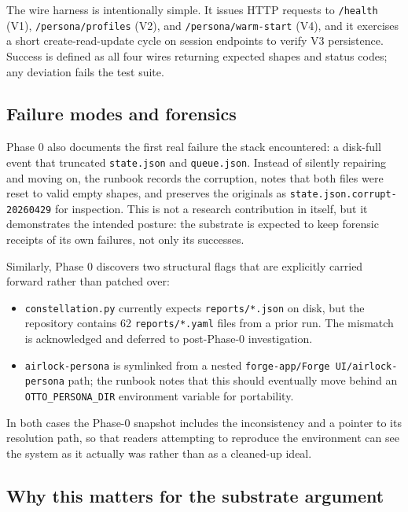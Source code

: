 \documentclass{article}
\providecommand{\tightlist}{\setlength{\itemsep}{0pt}\setlength{\parskip}{0pt}}
\begin{document}
The wire harness is intentionally simple. It issues HTTP requests to
\texttt{/health} (V1), \texttt{/persona/profiles} (V2), and
\texttt{/persona/warm-start} (V4), and it exercises a short
create-read-update cycle on session endpoints to verify V3 persistence.
Success is defined as all four wires returning expected shapes and
status codes; any deviation fails the test suite.

\subsection{Failure modes and
forensics}\label{failure-modes-and-forensics}

Phase 0 also documents the first real failure the stack encountered: a
disk-full event that truncated \texttt{state.json} and
\texttt{queue.json}. Instead of silently repairing and moving on, the
runbook records the corruption, notes that both files were reset to
valid empty shapes, and preserves the originals as
\texttt{state.json.corrupt-20260429} for inspection. This is not a
research contribution in itself, but it demonstrates the intended
posture: the substrate is expected to keep forensic receipts of its own
failures, not only its successes.

Similarly, Phase 0 discovers two structural flags that are explicitly
carried forward rather than patched over:

\begin{itemize}
\tightlist
\item
  \texttt{constellation.py} currently expects \texttt{reports/*.json} on
  disk, but the repository contains 62 \texttt{reports/*.yaml} files
  from a prior run. The mismatch is acknowledged and deferred to
  post-Phase-0 investigation.
\item
  \texttt{airlock-persona} is symlinked from a nested
  \texttt{forge-app/Forge\ UI/airlock-persona} path; the runbook notes
  that this should eventually move behind an \texttt{OTTO\_PERSONA\_DIR}
  environment variable for portability.
\end{itemize}

In both cases the Phase-0 snapshot includes the inconsistency and a
pointer to its resolution path, so that readers attempting to reproduce
the environment can see the system as it actually was rather than as a
cleaned-up ideal.

\subsection{Why this matters for the substrate
argument}\label{why-this-matters-for-the-substrate-argument}
\end{document}
